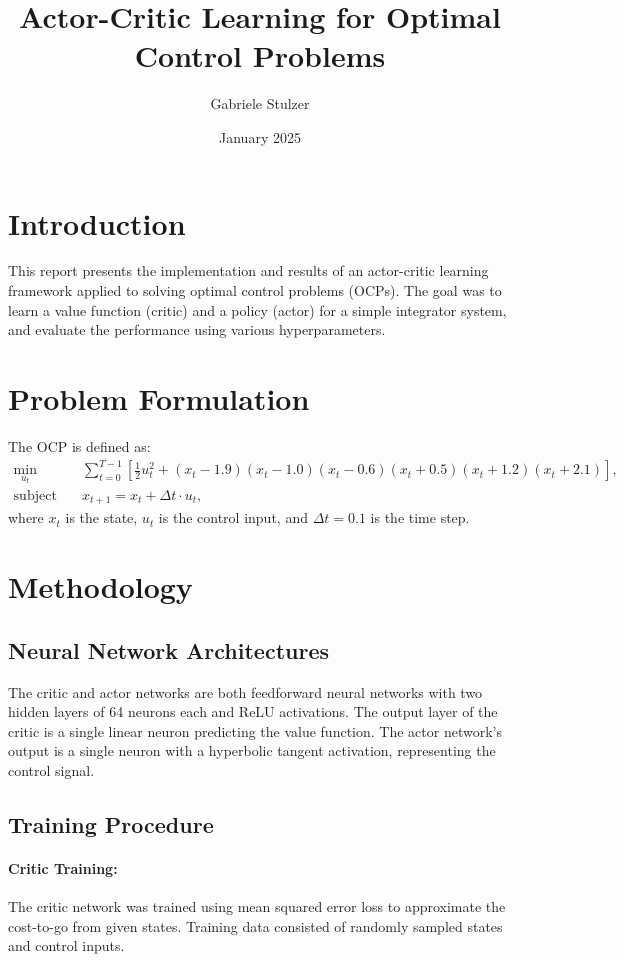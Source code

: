 \documentclass{article}
\title{Actor-Critic Learning for Optimal Control Problems}
\author{Gabriele Stulzer}
\date{January 2025}
\begin{document}
\maketitle

\section{Introduction}
This report presents the implementation and results of an actor-critic learning framework applied to solving optimal control problems (OCPs). The goal was to learn a value function (critic) and a policy (actor) for a simple integrator system, and evaluate the performance using various hyperparameters.

\section{Problem Formulation}
The OCP is defined as:
\begin{align}
    \min_{u_t} & \quad \sum_{t=0}^{T-1} \left[ \frac{1}{2} u_t^2 + (x_t - 1.9)(x_t - 1.0)(x_t - 0.6)(x_t + 0.5)(x_t + 1.2)(x_t + 2.1) \right], \\
    \text{subject to} & \quad x_{t+1} = x_t + \Delta t \cdot u_t,
\end{align}
where $x_t$ is the state, $u_t$ is the control input, and $\Delta t = 0.1$ is the time step.

\section{Methodology}

\subsection{Neural Network Architectures}
The critic and actor networks are both feedforward neural networks with two hidden layers of 64 neurons each and ReLU activations. The output layer of the critic is a single linear neuron predicting the value function. The actor network's output is a single neuron with a hyperbolic tangent activation, representing the control signal.

\subsection{Training Procedure}
\paragraph{Critic Training:}
The critic network was trained using mean squared error loss to approximate the cost-to-go from given states. Training data consisted of randomly sampled states and control inputs.
\end{document}
